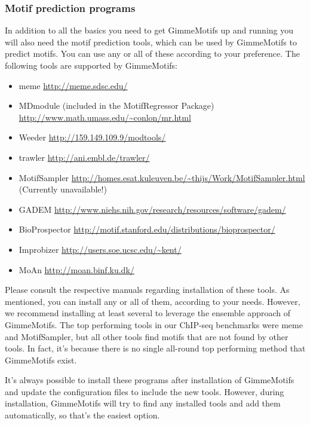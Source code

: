 \documentclass[10pt]{article}
\begin{document}
\subsubsection{Motif prediction programs}
In addition to all the basics you need to get GimmeMotifs up and running you will also need the motif prediction tools, which can be used by GimmeMotifs to predict motifs. You can use any or all of these according to your preference. The following tools are supported by GimmeMotifs:
\begin{itemize}
\item meme\cite{bailey_meme_2009} \url{http://meme.sdsc.edu/}
\item MDmodule\cite{liu_algorithm_2002} (included in the MotifRegressor
Package) \url{http://www.math.umass.edu/~conlon/mr.html}
\item Weeder\cite{pavesi_weeder_2004} \url{http://159.149.109.9/modtools/}
\item trawler\cite{ettwiller_trawler:_2007} \url{http://ani.embl.de/trawler/}
\item MotifSampler\cite{thijs_higher-order_2001} \url{http://homes.esat.kuleuven.be/~thijs/Work/MotifSampler.html} (Currently unavailable!)
\item GADEM\cite{li_gadem:genetic_2009} \url{http://www.niehs.nih.gov/research/resources/software/gadem/}
\item BioProspector \url{http://motif.stanford.edu/distributions/bioprospector/}
\item Improbizer \url{http://users.soe.ucsc.edu/~kent/}
\item MoAn\cite{valen_discovery_2009} \url{http://moan.binf.ku.dk/}
\end{itemize}
Please consult the respective manuals regarding installation of these tools. As mentioned, you can install any or all of them, according to your needs. However, we recommend installing at least several to leverage the ensemble approach of GimmeMotifs. The top performing tools in our ChIP-seq benchmarks were meme and MotifSampler, but all other tools find motifs that are not found by other tools. In fact, it's because there is no single all-round top performing method that GimmeMotifs exist. 

It's always possible to install these programs after installation of GimmeMotifs and update the configuration files to include the new tools. However, during installation, GimmeMotifs will try to find any installed tools and add them automatically, so that's the easiest option.
\end{document}
